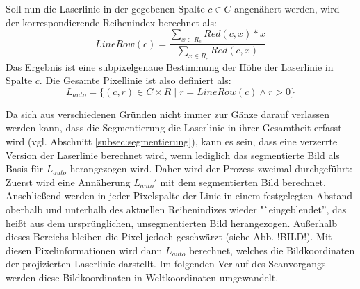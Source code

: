  Soll nun die Laserlinie in der gegebenen Spalte \(c \in C\) angenähert werden, wird der korrespondierende Reihenindex berechnet als:
\begin{equation}
LineRow(c) = \frac{\sum_{x \in R_{c}} Red(c,x) * x}{\sum_{x \in R_{c}} Red(c,x)}
\end{equation}
Das Ergebnis ist eine subpixelgenaue Bestimmung der Höhe der Laserlinie in Spalte \(c\). Die Gesamte Pixellinie ist also definiert als: 
\begin{equation}
L_{auto} = \lbrace (c,r) \in C \times R \mid r = LineRow(c) \wedge r > 0 \rbrace
\end{equation} 

Da sich aus verschiedenen Gründen nicht immer zur Gänze darauf verlassen werden kann, dass die Segmentierung die Laserlinie in ihrer  Gesamtheit erfasst wird (vgl. Abschnitt \ref{subsec:segmentierung}), kann es sein, dass eine verzerrte Version der Laserlinie berechnet wird, wenn lediglich das segmentierte Bild als Basis für \(L_{auto}\) herangezogen wird. Daher wird der Prozess zweimal durchgeführt: Zuerst wird eine Annäherung \(L_{auto}\prime\) mit dem segmentierten Bild berechnet. Anschließend werden in jeder Pixelspalte der Linie in einem festgelegten Abstand oberhalb und unterhalb des aktuellen Reihenindizes wieder "`eingeblendet'', das heißt aus dem ursprünglichen, unsegmentierten Bild herangezogen. Außerhalb dieses Bereichs bleiben die Pixel jedoch geschwärzt (siehe Abb. !BILD!). Mit diesen Pixelinformationen wird dann \(L_{auto}\) berechnet, welches die Bildkoordinaten der projizierten Laserlinie darstellt. Im folgenden Verlauf des Scanvorgangs werden diese Bildkoordinaten in Weltkoordinaten umgewandelt.

